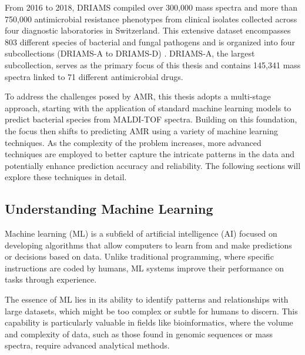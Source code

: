 \documentclass[english,11pt,a4paper,titlepage]{article}
\begin{document}
From 2016 to 2018, DRIAMS compiled over 300,000 mass spectra and more than 750,000 antimicrobial resistance phenotypes from clinical isolates collected across four diagnostic laboratories in Switzerland. This extensive dataset encompasses 803 different species of bacterial and fungal pathogens and is organized into four subcollections (DRIAMS-A to DRIAMS-D) \cite{weisDirectAntimicrobialResistance2022}. DRIAMS-A, the largest subcollection, serves as the primary focus of this thesis and contains 145,341 mass spectra linked to 71 different antimicrobial drugs.

To address the challenges posed by AMR, this thesis adopts a multi-stage approach, starting with the application of standard machine learning models to predict bacterial species from MALDI-TOF spectra. Building on this foundation, the focus then shifts to predicting AMR using a variety of machine learning techniques. As the complexity of the problem increases, more advanced techniques are employed to better capture the intricate patterns in the data and potentially enhance prediction accuracy and reliability. The following sections will explore these techniques in detail.


	\subsection*{Understanding Machine Learning}
	Machine learning (ML) is a subfield of artificial intelligence (AI) focused on developing algorithms that allow computers to learn from and make predictions or decisions based on data. Unlike traditional programming, where specific instructions are coded by humans, ML systems improve their performance on tasks through experience.
	
	The essence of ML lies in its ability to identify patterns and relationships with large datasets, which might be too complex or subtle for humans to discern. This capability is particularly valuable in fields like bioinformatics, where the volume and complexity of data, such as those found in genomic sequences or mass spectra, require advanced analytical methods.
	
\end{document}
